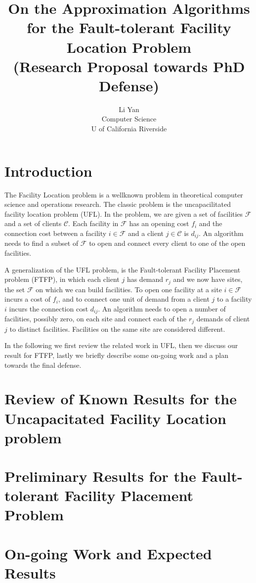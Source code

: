 \documentclass{article}
\title{On the Approximation Algorithms for the Fault-tolerant Facility Location Problem\\(Research Proposal towards PhD Defense)}
\author{Li Yan\\Computer Science\\U of California Riverside}
\newcommand{\fac}{\mathcal{F}}
\newcommand{\cli}{\mathcal{C}}
\begin{document}
\maketitle

\section{Introduction}
The Facility Location problem is a wellknown problem in theoretical
computer science and operations research. The classic problem is the
uncapacilitated facility location problem (UFL). In the problem, we
are given a set of facilities $\fac$ and a set of clients $\cli$. Each
facility in $\fac$ has an opening cost $f_i$ and the connection cost
between a facility $i\in \fac$ and a client $j\in \cli$ is
$d_{ij}$. An algorithm needs to find a subset of $\fac$ to open and
connect every client to one of the open facilities.

A generalization of the UFL problem, is the Fault-tolerant Facility
Placement problem (FTFP), in which each client $j$ has demand $r_j$
and we now have sites, the set $\fac$ on which we can build
facilities. To open one facility at a site $i\in \fac$ incurs a cost
of $f_i$, and to connect one unit of demand from a client $j$ to a
facility $i$ incurs the connection cost $d_{ij}$. An algorithm needs
to open a number of facilities, possibly zero, on each site and
connect each of the $r_j$ demands of client $j$ to distinct
facilities. Facilities on the same site are considered different.

In the following we first review the related work in UFL, then we
discuss our result for FTFP, lastly we briefly describe some on-going
work and a plan towards the final defense.

\section{Review of Known Results for the Uncapacitated Facility
  Location problem}
\section{Preliminary Results for the Fault-tolerant Facility Placement Problem}
\section{On-going Work and Expected Results}
\end{document}
